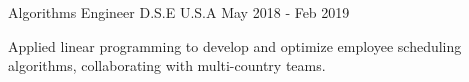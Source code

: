 
\begin{cventries}

  \cventry
    {Algorithms Engineer} %
    {D.S.E} %
    {U.S.A} %
    {May 2018 ‑ Feb 2019} %
    {
      \begin{cvitems} %
      \item{Applied linear programming to develop and optimize employee scheduling algorithms, collaborating with multi-country teams.}
      \end{cvitems}
    }
  

\end{cventries}
